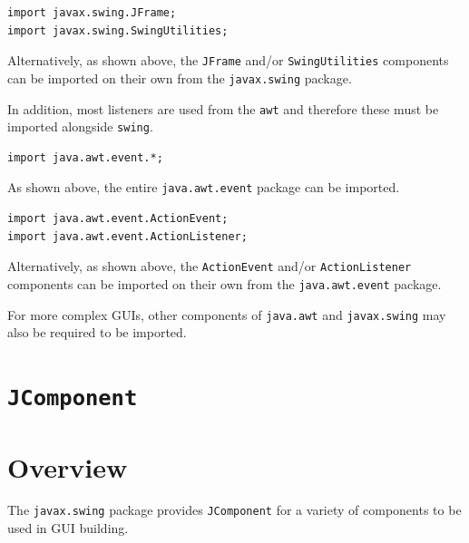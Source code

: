 \documentclass[a4paper]{systems-software}
\begin{document}
\begin{lstlisting}[title={Importing the JFrame and SwingUtilities components from the javax.swing package.}]
import javax.swing.JFrame;
import javax.swing.SwingUtilities;
\end{lstlisting}

Alternatively, as shown above, the \texttt{JFrame} and/or \texttt{SwingUtilities} components can be imported on their own from the \texttt{javax.swing} package.

In addition, most listeners are used from the \texttt{awt} and therefore these must be imported alongside \texttt{swing}.

\begin{lstlisting}[title={Importing the entire java.awt.event package.}]
import java.awt.event.*;
\end{lstlisting}

As shown above, the entire \texttt{java.awt.event} package can be imported.

\begin{lstlisting}[title={Importing the ActionEvent and ActionListener components from the java.awt.event package.}]
import java.awt.event.ActionEvent;
import java.awt.event.ActionListener;
\end{lstlisting}

Alternatively, as shown above, the \texttt{ActionEvent} and/or \texttt{ActionListener} components can be imported on their own from the \texttt{java.awt.event} package.

For more complex GUIs, other components of \texttt{java.awt} and \texttt{javax.swing} may also be required to be imported.


\section{\texttt{JComponent}}

\section*{Overview}

The \texttt{javax.swing} package provides \texttt{JComponent} for a variety of components to be used in GUI building.
\end{document}
